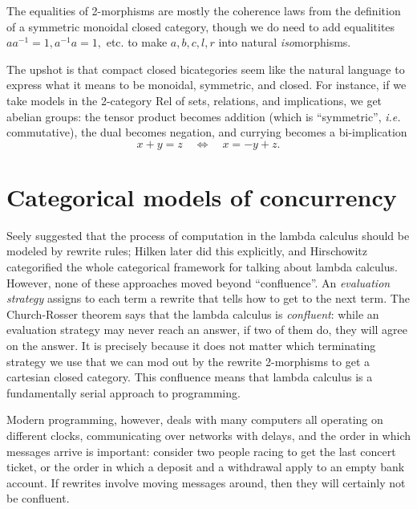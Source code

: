 \documentclass[12pt,twoside,openright]{report}
\begin{document}
The equalities of 2-morphisms are mostly the coherence laws from the definition of a symmetric monoidal closed category, though we do need to add equalitites $aa^{-1} = 1, a^{-1}a = 1,$ etc. to make $a,b,c,l,r$ into natural {\em iso}morphisms.

The upshot is that compact closed bicategories seem like the natural language to express what it means to be monoidal, symmetric, and closed.  For instance, if we take models in the 2-category Rel of sets, relations, and implications, we get abelian groups: the tensor product becomes addition (which is ``symmetric'', {\em i.e.} commutative), the dual becomes negation, and currying becomes a bi-implication
\[ x + y = z \quad \iff \quad x = -y + z. \]

\section{Categorical models of concurrency}

Seely \cite{Seely} suggested that the process of computation in the lambda calculus should be modeled by rewrite rules; Hilken \cite{Hilken} later did this explicitly, and Hirschowitz \cite{Hirschowitz} categorified the whole categorical framework for talking about lambda calculus.  However, none of these approaches moved beyond ``confluence''.  An {\sl evaluation strategy} assigns to each term a rewrite that tells how to get to the next term.  The Church-Rosser theorem says that the lambda calculus is {\sl confluent}: while an evaluation strategy may never reach an answer, if two of them do, they will agree on the answer.  It is precisely because it does not matter which terminating strategy we use that we can mod out by the rewrite 2-morphisms to get a cartesian closed category.  This confluence means that lambda calculus is a fundamentally serial approach to programming.

Modern programming, however, deals with many computers all operating on different clocks, communicating over networks with delays, and the order in which messages arrive is important: consider two people racing to get the last concert ticket, or the order in which a deposit and a withdrawal apply to an empty bank account.  If rewrites involve moving messages around, then they will certainly not be confluent.
\end{document}
